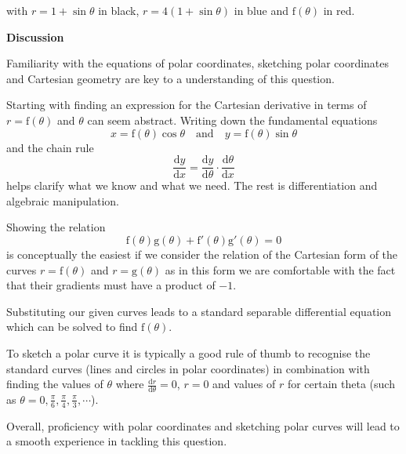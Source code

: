 \documentclass{article}
\newcommand{\der}[2]{\frac{\mathrm{d}#1}{\mathrm{d}#2}}
\begin{document}
with $r=1+\sin\theta$ in black, $r=4(1+\sin\theta)$ in blue and $\mathrm{f}(\theta)$ in red.

\newpage

\begin{center}
    \textbf{Discussion}
\end{center}

\vspace{0.5cm}

Familiarity with the equations of polar coordinates, sketching polar coordinates and Cartesian geometry are key to a understanding of this question.\par
\quad Starting with finding an expression for the Cartesian derivative in terms of $r=\mathrm{f}(\theta)$ and $\theta$ can seem abstract. Writing down the fundamental equations 
\[
x = \mathrm{f}(\theta) \cos \theta \quad \text{and} \quad y = \mathrm{f}(\theta) \sin \theta 
\]
and the chain rule
\[
\der{y}{x} = \der{y}{\theta} \cdot \der{\theta}{x}
\]
helps clarify what we know and what we need. The rest is differentiation and algebraic manipulation. \par
\quad Showing the relation 
\[
\mathrm{f}(\theta)\mathrm{g}(\theta) + \mathrm{f}'(\theta)\mathrm{g}'(\theta)=0
\]
is conceptually the easiest if we consider the relation of the Cartesian form of the curves $r=\mathrm{f}(\theta)$ and $r=\mathrm{g}(\theta)$ as in this form we are comfortable with the fact that their gradients must have a product of $-1$.\par
\quad Substituting our given curves leads to a standard separable differential equation which can be solved to find $\mathrm{f}(\theta)$.\par
\quad To sketch a polar curve it is typically a good rule of thumb to recognise the standard curves (lines and circles in polar coordinates) in combination with finding the values of $\theta$ where $\der{r}{\theta}=0$, $r=0$ and values of $r$ for certain theta (such as $\theta=0,\frac{\pi}{6},\frac{\pi}{4},\frac{\pi}{3},\cdots$).\par
\quad Overall, proficiency with polar coordinates and sketching polar curves will lead to a smooth experience in tackling this question. 
\end{document}
